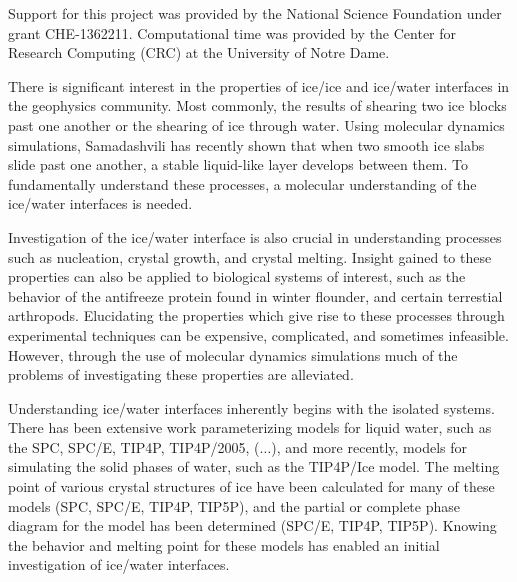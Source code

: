 \documentclass{pnastwo}
\begin{document}
\begin{article}
\begin{acknowledgments}
  Support for this project was provided by the National
  Science Foundation under grant CHE-1362211. Computational time was
  provided by the Center for Research Computing (CRC) at the
  University of Notre Dame.
\end{acknowledgments}

\newpage



There is significant interest in the properties of ice/ice and ice/water 
interfaces in the geophysics community. Most commonly, the results of shearing
two ice blocks past one 
another\cite{Casassa91, Sukhorukov13, Pritchard12, Lishman13} or the shearing 
of ice through water\cite{Cuffey99, Bell08}. Using molecular dynamics 
simulations, Samadashvili has recently shown that when two smooth ice slabs 
slide past one another, a stable liquid-like layer develops between 
them\cite{Samadashvili13}. To fundamentally understand these processes, a 
molecular understanding of the ice/water interfaces is needed.     

Investigation of the ice/water interface is also crucial in understanding
processes such as nucleation, crystal 
growth,\cite{Han92, Granasy95, Vanfleet95} and crystal 
melting\cite{Weber83, Han92, Sakai96, Sakai96B}. Insight gained to these
properties can also be applied to biological systems of interest, such as 
the behavior of the antifreeze protein found in winter 
flounder,\cite{Wierzbicki07,Chapsky97} and certain terrestial
arthropods.\cite{Duman:2001qy,Meister29012013} Elucidating the properties which
give rise to these processes through experimental techniques can be expensive,
complicated, and sometimes infeasible. However, through the use of molecular 
dynamics simulations much of the problems of investigating these properties
are alleviated.

Understanding ice/water interfaces inherently begins with the isolated
systems. There has been extensive work parameterizing models for liquid water,
such as the SPC\cite{Berendsen81}, SPC/E\cite{Berendsen87}, 
TIP4P\cite{Jorgensen85}, TIP4P/2005\cite{Abascal05}, 
($\dots$), and more recently, models for simulating
the solid phases of water, such as the TIP4P/Ice\cite{Abascal05b} model. The 
melting point of various crystal structures of ice have been calculated for 
many of these models
(SPC\cite{Karim90,Abascal07}, SPC/E\cite{Baez95,Arbuckle02,Gay02,Bryk02,Bryk04b,Sanz04b,Gernandez06,Abascal07,Vrbka07}, TIP4P\cite{Karim88,Gao00,Sanz04,Sanz04b,Koyama04,Wang05,Fernandez06,Abascal07}, TIP5P\cite{Sanz04,Koyama04,Wang05,Fernandez06,Abascal07}), 
and the partial or complete phase diagram for the model has been determined
(SPC/E\cite{Baez95,Bryk04b,Sanz04b}, TIP4P\cite{Sanz04,Sanz04b,Koyama04}, TIP5P\cite{Sanz04,Koyama04}). 
Knowing the behavior and melting point for these models has enabled an initial 
investigation of ice/water interfaces. 


\end{article}
\end{document}
